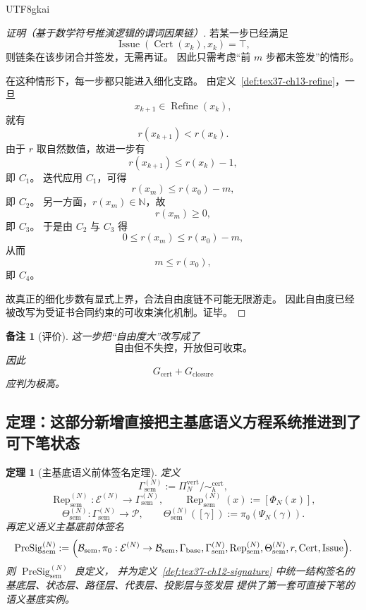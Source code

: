 \documentclass[12pt]{article}
\newtheorem{theorem}{定理}[section]
\newtheorem{remark}{备注}[section]
\newcommand{\NN}{\mathbb{N}}
\newcommand{\Cert}{\operatorname{Cert}}
\newcommand{\Refine}{\operatorname{Refine}}
\newcommand{\Issue}{\operatorname{Issue}}
\begin{document}
\begin{CJK*}{UTF8}{gkai}
\begin{proof}[证明（基于数学符号推演逻辑的谓词因果链）]
若某一步已经满足
\[
  \Issue(\Cert(x_k),x_k)=\top,
\]
则链条在该步闭合并签发，无需再证。
因此只需考虑“前 $m$ 步都未签发”的情形。

在这种情形下，每一步都只能进入细化支路。
由定义~\ref{def:tex37-ch13-refine}，一旦
\[
  x_{k+1}\in \Refine(x_k),
\]
就有
\[
  r(x_{k+1})<r(x_k).
\]
由于 $r$ 取自然数值，故进一步有
\[
  r(x_{k+1})\le r(x_k)-1,
\]
即 $C_1$。
迭代应用 $C_1$，可得
\[
  r(x_m)\le r(x_0)-m,
\]
即 $C_2$。
另一方面，$r(x_m)\in\NN$，故
\[
  r(x_m)\ge 0,
\]
即 $C_3$。
于是由 $C_2$ 与 $C_3$ 得
\[
  0\le r(x_m)\le r(x_0)-m,
\]
从而
\[
  m\le r(x_0),
\]
即 $C_4$。

故真正的细化步数有显式上界，合法自由度链不可能无限游走。
因此自由度已经被改写为受证书合同约束的可收束演化机制。证毕。
\end{proof}

\begin{remark}[评价]
这一步把“自由度大”改写成了
\[
  \boxed{
    \text{自由但不失控，开放但可收束。}
  }
\]
因此
\[
  G_{\mathrm{cert}}+G_{\mathrm{closure}}
\]
应判为极高。
\end{remark}

\subsection{定理：这部分新增直接把主基底语义方程系统推进到了可下笔状态}
\label{subsec:tex37-ch14-equation}

\begin{theorem}[主基底语义前体签名定理]
\label{thm:tex37-ch14-equation}
定义
\[
  \Gamma_{\mathrm{sem}}^{(N)}
  :=
  \Pi_N^{\mathrm{vert}}/\!\sim_h^{\mathrm{cert}},
\]
\[
  \operatorname{Rep}_{\mathrm{sem}}^{(N)}:\mathcal E^{(N)}\to \Gamma_{\mathrm{sem}}^{(N)},
  \qquad
  \operatorname{Rep}_{\mathrm{sem}}^{(N)}(x):=[\Phi_N(x)],
\]
\[
  \Theta_{\mathrm{sem}}^{(N)}:\Gamma_{\mathrm{sem}}^{(N)}\to \mathcal P,
  \qquad
  \Theta_{\mathrm{sem}}^{(N)}([\gamma]):=\pi_0(\Psi_N(\gamma)).
\]
再定义语义主基底前体签名
\[
  \operatorname{PreSig}_{\mathrm{sem}}^{(N)}
  :=
  \Bigl(
    \mathcal B_{\mathrm{sem}},
    \pi_0:\mathcal E^{(N)}\to \mathcal B_{\mathrm{sem}},
    \Gamma_{\mathrm{base}},
    \Gamma_{\mathrm{sem}}^{(N)},
    \operatorname{Rep}_{\mathrm{sem}}^{(N)},
    \Theta_{\mathrm{sem}}^{(N)},
    r,
    \Cert,
    \Issue
  \Bigr).
\]
则 $\operatorname{PreSig}_{\mathrm{sem}}^{(N)}$ 良定义，
并为定义~\ref{def:tex37-ch12-signature} 中统一结构签名的基底层、状态层、路径层、代表层、投影层与签发层
提供了第一套可直接下笔的语义基底实例。
\end{theorem}


\end{CJK*}
\end{document}
